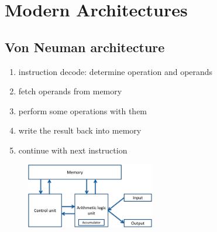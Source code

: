 \chapter{Modern Architectures}
    \section{Von Neuman architecture}
        \begin{enumerate}
            \item instruction decode: determine operation and operands
            \item fetch operands from memory
            \item perform some operations with them
            \item write the result back into memory
            \item continue with next instruction
        \end{enumerate}
        

        \begin{figure}[h]
            \centering
            \includegraphics[width=0.5\textwidth]{02_Modern_Architectures/Von_Neuman_Architecture.png}
        \end{figure}
        
        